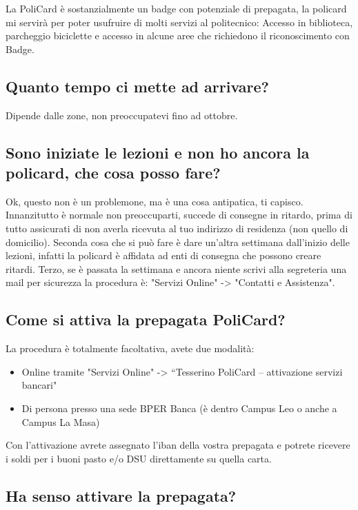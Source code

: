 \documentclass[legal]{polinetwork}
\begin{document}
La PoliCard è sostanzialmente un badge con potenziale di prepagata, la policard mi servirà per poter usufruire di molti servizi al politecnico: Accesso in biblioteca, parcheggio biciclette e accesso in alcune aree che richiedono il riconoscimento con Badge.

\subsection{Quanto tempo ci mette ad arrivare?}


Dipende dalle zone, non preoccupatevi fino ad ottobre.

\subsection{Sono iniziate le lezioni e non ho ancora la policard, che cosa posso fare?}


Ok, questo non è un problemone, ma è una cosa antipatica, ti capisco. Innanzitutto è normale non preoccuparti, succede di consegne in ritardo, prima di tutto assicurati di non averla ricevuta al tuo indirizzo di residenza (non quello di domicilio). Seconda cosa che si può fare è dare un'altra settimana dall'inizio delle lezioni, infatti la policard è affidata ad enti di consegna che possono creare ritardi. Terzo, se è passata la settimana e ancora niente scrivi alla segreteria una mail per sicurezza la procedura è: "Servizi Online" -> "Contatti e Assistenza".

\subsection{Come si attiva la prepagata PoliCard?}


La procedura è totalmente facoltativa, avete due modalità:

\begin{itemize}
  \item Online tramite "Servizi Online" -> “Tesserino PoliCard – attivazione servizi bancari"
  \item Di persona presso una sede BPER Banca (è dentro Campus Leo o anche a Campus La Masa)
\end{itemize}


Con l'attivazione avrete assegnato l'iban della vostra prepagata e potrete ricevere i soldi per i buoni pasto e/o DSU direttamente su quella carta.

\subsection{Ha senso attivare la prepagata?}
\end{document}
